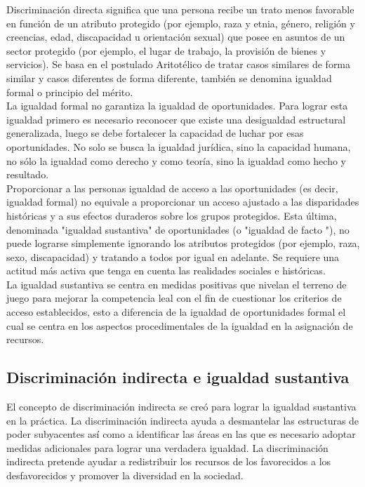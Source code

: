 Discriminación directa significa que una persona recibe un trato menos favorable en función de un atributo protegido (por ejemplo, raza y etnia,  género, religión y creencias, edad, discapacidad u orientación sexual) que posee en asuntos de un sector protegido (por ejemplo, el lugar de trabajo, la provisión de bienes y servicios). Se basa en el postulado Aritotélico de tratar casos similares de forma similar y casos diferentes de forma diferente, también se denomina igualdad formal o principio del mérito.\\

La igualdad formal no garantiza la igualdad de oportunidades. Para lograr esta igualdad primero es necesario reconocer que existe una desigualdad estructural generalizada, luego se debe fortalecer la capacidad de luchar por esas oportunidades. No solo se busca la igualdad jurídica, sino la capacidad humana, no sólo la igualdad como derecho y como teoría, sino la igualdad como hecho y resultado.\\

Proporcionar a las personas igualdad de acceso a las oportunidades (es decir, igualdad formal) no equivale a proporcionar un acceso ajustado a las disparidades históricas y a sus efectos duraderos sobre los grupos protegidos. Esta última, denominada "igualdad sustantiva" de oportunidades (o "igualdad de facto "), no puede lograrse simplemente ignorando los atributos protegidos (por ejemplo, raza, sexo, discapacidad) y tratando a todos por igual en adelante. Se requiere una actitud más activa que tenga en cuenta las realidades sociales e históricas.\\

La igualdad sustantiva se centra en medidas positivas que nivelan el terreno de juego para mejorar la competencia leal con el fin de cuestionar los criterios de acceso establecidos, esto a diferencia de la igualdad de oportunidades formal el cual se centra en los aspectos procedimentales de la igualdad en la asignación de recursos.


\subsection{Discriminación indirecta e igualdad sustantiva}
El concepto de discriminación indirecta se creó para lograr la igualdad sustantiva en la práctica. La discriminación indirecta ayuda a desmantelar las estructuras de poder subyacentes así como a identificar las áreas en las que es necesario adoptar medidas adicionales para lograr una verdadera igualdad. La discriminación indirecta pretende ayudar a redistribuir los recursos de los favorecidos a los desfavorecidos y promover la diversidad en la sociedad. \\

